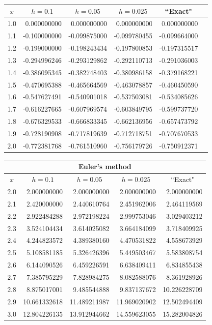 \documentclass[dvips]{book}
\renewcommand{\exer}[1]{\par\medskip\;\noindent{\color{red}\bf #1.}}
\numberwithin{example}{section}
\numberwithin{equation}{section}
\numberwithin{theorem}{section}
\numberwithin{table}{section}
\numberwithin{figure}{section}
\begin{document}
\exer{3.1.12}
{\small
\begin{tabular}{|c|r|r|r|r|r|}
\hline
\multicolumn{1}{|c|}{$x$}&
\multicolumn{1}{|c|}{$h=0.1$}&
\multicolumn{1}{|c|}{$h=0.05$}&
\multicolumn{1}{|c|}{$h=0.025$}&
\multicolumn{1}{|c|}{``Exact"}\\ \hline
1.0 &  0.000000000 &  0.000000000 &  0.000000000 &  0.000000000 \\
1.1 & -0.100000000 & -0.099875000 & -0.099780455 & -0.099664000 \\
1.2 & -0.199000000 & -0.198243434 & -0.197800853 & -0.197315517 \\
1.3 & -0.294996246 & -0.293129862 & -0.292110713 & -0.291036003 \\
1.4 & -0.386095345 & -0.382748403 & -0.380986158 & -0.379168221 \\
1.5 & -0.470695388 & -0.465664569 & -0.463078857 & -0.460450590 \\
1.6 & -0.547627491 & -0.540901018 & -0.537503081 & -0.534085626 \\
1.7 & -0.616227665 & -0.607969574 & -0.603849795 & -0.599737720 \\
1.8 & -0.676329533 & -0.666833345 & -0.662136956 & -0.657473792 \\
1.9 & -0.728190908 & -0.717819639 & -0.712718751 & -0.707670533 \\
2.0 & -0.772381768 & -0.761510960 & -0.756179726 & -0.750912371 \\
\hline
\end{tabular}}



\exer{3.1.14}
{\small
\begin{tabular}{|c|r|r|r|r|}
\hline
\multicolumn{5}{|c|}{Euler's method}\\\hline
\multicolumn{1}{|c|}{$x$}&
\multicolumn{1}{|c|}{$h=0.1$}&
\multicolumn{1}{|c|}{$h=0.05$}&
\multicolumn{1}{|c|}{$h=0.025$}&
\multicolumn{1}{|c|}{``Exact"}\\ \hline
2.0 &  2.000000000 &  2.000000000 &  2.000000000 &  2.000000000 \\
2.1 &  2.420000000 &  2.440610764 &  2.451962006 &  2.464119569 \\
2.2 &  2.922484288 &  2.972198224 &  2.999753046 &  3.029403212 \\
2.3 &  3.524104434 &  3.614025082 &  3.664184099 &  3.718409925 \\
2.4 &  4.244823572 &  4.389380160 &  4.470531822 &  4.558673929 \\
2.5 &  5.108581185 &  5.326426396 &  5.449503467 &  5.583808754 \\
2.6 &  6.144090526 &  6.459226591 &  6.638409411 &  6.834855438 \\
2.7 &  7.385795229 & 7.828984275  & 8.082588076  & 8.361928926 \\
2.8 &  8.875017001 & 9.485544888  & 9.837137672  & 10.226228709 \\
2.9 & 10.661332618 & 11.489211987 & 11.969020902 & 12.502494409 \\
3.0 &12.804226135 & 13.912944662 & 14.559623055 & 15.282004826 \\
\hline
\end{tabular}}
\end{document}
